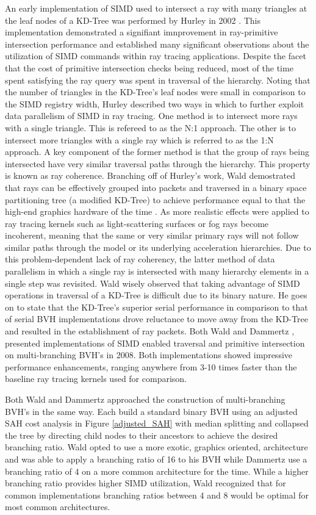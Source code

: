 \documentclass[12pt, a4paper]{article}
\begin{document}
An early implementation of SIMD used to intersect a ray with many triangles at the leaf nodes of a KD-Tree was performed by Hurley in 2002 \cite{Hurley_2002}. This implementation demonstrated a signifiant imnprovement in ray-primitive intersection performance and established many significant observations about the utilization of SIMD commands within ray tracing applications. Despite the facet that the cost of primitive intersection checks being reduced, most of the time spent satisfying the ray query was spent in traversal of the hierarchy. Noting that the number of triangles in the KD-Tree's leaf nodes were small in comparison to the SIMD registry width, Hurley described two ways in which to further exploit data parallelism of SIMD in ray tracing. One method is to intersect more rays with a single triangle. This is refereed to as the N:1 approach. The other is to intersect more triangles with a single ray which is referred to as the 1:N approach. A key component of the former method is that the group of rays being intersected have very similar traversal paths through the hierarchy. This property is known as ray coherence. Branching off of Hurley's work, Wald demostrated that rays can be effectively grouped into packets and traversed in a binary space partitioning tree (a modified KD-Tree) to achieve performance equal to that the high-end graphics hardware of the time \cite{Wald_2001}. As more realistic effects were applied to ray tracing kernels such as light-scattering surfaces or fog rays become incoherent, meaning that the same or very similar primary rays will not follow similar paths through the model or its underlying acceleration hierarchies. Due to this problem-dependent lack of ray coherency, the latter method of data parallelism in which a single ray is intersected with many hierarchy elements in a single step was revisited. Wald wisely observed that taking advantage of SIMD operations in traversal of a KD-Tree is difficult due to its binary nature. He goes on to state that the KD-Tree's superior serial performance in comparison to that of serial BVH implementations drove reluctance to move away from the KD-Tree and resulted in the establishment of ray packets. \cite{Wald_2008} Both Wald and Dammertz \cite{Dammertz_2008}, presented implementations of SIMD enabled traversal and primitive intersection on multi-branching BVH's in 2008. Both implementations showed impressive performance enhancements, ranging anywhere from 3-10 times faster than the baseline ray tracing kernels used for comparison.

Both Wald and Dammertz approached the construction of multi-branching BVH's in the same way. Each build a standard binary BVH using an adjusted SAH cost analysis in Figure \ref{adjusted_SAH} with median splitting and collapsed the tree by directing child nodes to their ancestors to achieve the desired branching ratio. Wald opted to use a more exotic, graphics oriented, architecture and was able to apply a branching ratio of 16 to his BVH while Dammertz use a branching ratio of 4 on a more common architecture for the time. While a higher branching ratio provides higher SIMD utilization, Wald recognized that for common implementations branching ratios between 4 and 8 would be optimal for most common architectures.
\end{document}
